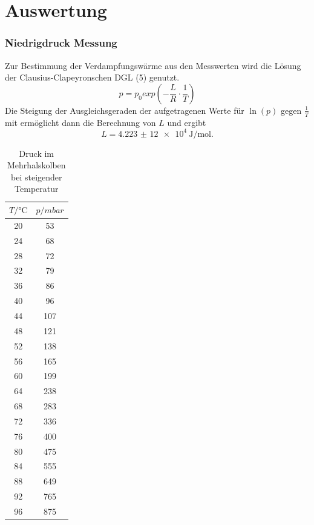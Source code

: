 \section{Auswertung}
\label{sec:Auswertung}


\subsubsection{Niedrigdruck Messung}
\label{subs:Niedrigdruck Messung}

Zur Bestimmung der Verdampfungswärme aus den Messwerten wird die Lösung der Clausius-Clapeyronschen DGL (5) genutzt.
\begin{equation*}
  p = p_0exp(-\frac{L}{R}\cdot\frac{1}{T})
\end{equation*}
Die Steigung der Ausgleichsgeraden der aufgetragenen Werte für
$\ln(p)$ gegen $\frac{1}{T}$ mit  ermöglicht
dann die Berechnung von $L$ und ergibt
\begin{equation*}
  L = \SI{4,223(12)e4}{\joule\per\mol}.
\end{equation*}
\begin{table}
\centering
\caption{Druck im Mehrhalskolben bei steigender Temperatur}
\label{tab:Dicke}
  \begin{tabular}{ c c }
    \toprule
    $ T/\si{\celsius}$ & $p/mbar$ \\
    \midrule
    20 & 53    \\
    24 & 68    \\
    28 & 72    \\
    32 & 79    \\
    36 & 86    \\
    40 & 96    \\
    44 & 107   \\
    48 & 121   \\
    52 & 138   \\
    56 & 165   \\
    60 & 199   \\
    64 & 238   \\
    68 & 283   \\
    72 & 336   \\
    76 & 400   \\
    80 & 475   \\
    84 & 555   \\
    88 & 649   \\
    92 & 765   \\
    96 & 875   \\
    \bottomrule
  \end{tabular}
\end{table}
